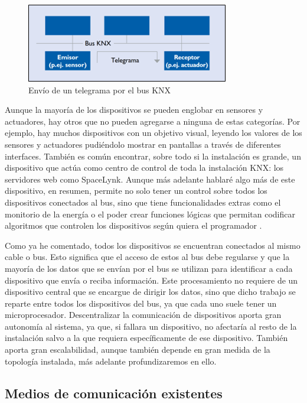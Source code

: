 \begin{figure}
    \centering
    \includegraphics{imagenes/capitulo1/envioTelegrama.png}
    \caption{Envío de un telegrama por el bus KNX}
    \label{fig:envio_telegrama}
\end{figure}

Aunque la mayoría de los dispositivos se pueden englobar en sensores y actuadores, hay otros que no pueden agregarse a ninguna de estas categorías. Por ejemplo, hay muchos dispositivos con un objetivo visual, leyendo los valores de los sensores y actuadores pudiéndolo mostrar en pantallas a través de diferentes interfaces. También es común encontrar, sobre todo si la instalación es grande, un dispositivo que actúa como centro de control de toda la instalación KNX: los servidores web como SpaceLynk. Aunque más adelante hablaré algo más de este dispositivo, en resumen, permite no solo tener un control sobre todos los dispositivos conectados al bus, sino que tiene funcionalidades extras como el monitorio de la energía o el poder crear funciones lógicas que permitan codificar algoritmos que controlen los dispositivos según quiera el programador \cite{intro_6}.

Como ya he comentado, todos los dispositivos se encuentran conectados al mismo cable o bus. Esto significa que el acceso de estos al bus debe regularse y que la mayoría de los datos que se envían por el bus se utilizan para identificar a cada dispositivo que envía o reciba información. 
Este procesamiento no requiere de un dispositivo central que se encargue de dirigir los datos, sino que dicho trabajo se reparte entre todos los dispositivos del bus, ya que cada uno suele tener un microprocesador. Descentralizar la comunicación de dispositivos aporta gran autonomía al sistema, ya que, si fallara un dispositivo, no afectaría al resto de la instalación salvo a la que requiera específicamente de ese dispositivo. También aporta gran escalabilidad, aunque también depende en gran medida de la topología instalada, más adelante profundizaremos en ello.

\subsection{Medios de comunicación existentes}

